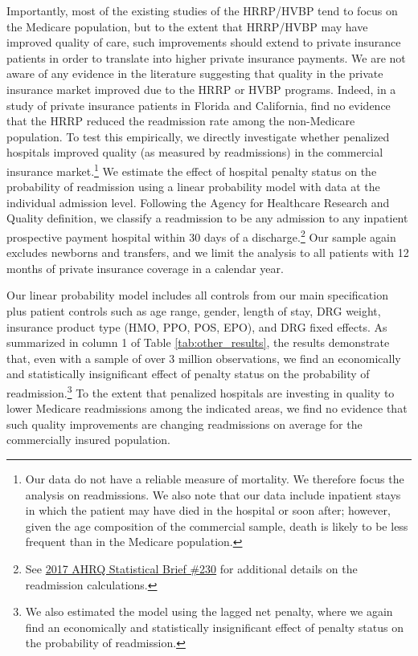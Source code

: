 \documentclass[12pt]{article}
\begin{document}
Importantly, most of the existing studies of the HRRP/HVBP tend to focus on the Medicare population, but to the extent that HRRP/HVBP may have improved quality of care, such improvements should extend to private insurance patients in order to translate into higher private insurance payments. We are not aware of any evidence in the literature suggesting that quality in the private insurance market improved due to the HRRP or HVBP programs. Indeed, in a study of private insurance patients in Florida and California, \cite{demiralp2017} find no evidence that the HRRP reduced the readmission rate among the non-Medicare population. To test this empirically, we directly investigate whether penalized hospitals improved quality (as measured by readmissions) in the commercial insurance market.\footnote{Our data do not have a reliable measure of mortality. We therefore focus the analysis on readmissions. We also note that our data include inpatient stays in which the patient may have died in the hospital or soon after; however, given the age composition of the commercial sample, death is likely to be less frequent than in the Medicare population.} We estimate the effect of hospital penalty status on the probability of readmission using a linear probability model with data at the individual admission level. Following the Agency for Healthcare Research and Quality definition, we classify a readmission to be any admission to any inpatient prospective payment hospital within 30 days of a discharge.\footnote{See \href{https://www.hcup-us.ahrq.gov/reports/statbriefs/sb230-7-Day-Versus-30-Day-Readmissions.jsp?utm_source=ahrq&utm_medium=en1&utm_term=&utm_content=1&utm_campaign=ahrq_en11_7_2017}{2017 AHRQ Statistical Brief \#230} for additional details on the readmission calculations.} Our sample again excludes newborns and transfers, and we limit the analysis to all patients with 12 months of private insurance coverage in a calendar year.

Our linear probability model includes all controls from our main specification plus patient controls such as age range, gender, length of stay, DRG weight, insurance product type (HMO, PPO, POS, EPO), and DRG fixed effects. As summarized in column 1 of Table \ref{tab:other_results}, the results demonstrate that, even with a sample of over 3 million observations, we find an economically and statistically insignificant effect of penalty status on the probability of readmission.\footnote{We also estimated the model using the lagged net penalty, where we again find an economically and statistically insignificant effect of penalty status on the probability of readmission.} To the extent that penalized hospitals are investing in quality to lower Medicare readmissions among the indicated areas, we find no evidence that such quality improvements are changing readmissions on average for the commercially insured population.
\end{document}
